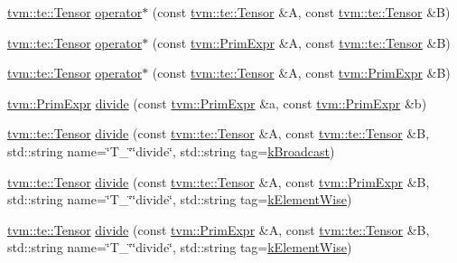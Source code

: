\begin{DoxyCompactItemize}
\item 
\hyperlink{classtvm_1_1te_1_1Tensor}{tvm\+::te\+::\+Tensor} \hyperlink{namespacetopi_a65ef01a87472380d8fb282bc16061583}{operator$\ast$} (const \hyperlink{classtvm_1_1te_1_1Tensor}{tvm\+::te\+::\+Tensor} \&A, const \hyperlink{classtvm_1_1te_1_1Tensor}{tvm\+::te\+::\+Tensor} \&B)
\item 
\hyperlink{classtvm_1_1te_1_1Tensor}{tvm\+::te\+::\+Tensor} \hyperlink{namespacetopi_a14b5d16d00a8b668c19e440a86a0244f}{operator$\ast$} (const \hyperlink{classtvm_1_1PrimExpr}{tvm\+::\+Prim\+Expr} \&A, const \hyperlink{classtvm_1_1te_1_1Tensor}{tvm\+::te\+::\+Tensor} \&B)
\item 
\hyperlink{classtvm_1_1te_1_1Tensor}{tvm\+::te\+::\+Tensor} \hyperlink{namespacetopi_a33baa22e21f625b772b34cf99b234d6d}{operator$\ast$} (const \hyperlink{classtvm_1_1te_1_1Tensor}{tvm\+::te\+::\+Tensor} \&A, const \hyperlink{classtvm_1_1PrimExpr}{tvm\+::\+Prim\+Expr} \&B)
\item 
\hyperlink{classtvm_1_1PrimExpr}{tvm\+::\+Prim\+Expr} \hyperlink{namespacetopi_ab98c1bef2250b920060a8d92f2db2d93}{divide} (const \hyperlink{classtvm_1_1PrimExpr}{tvm\+::\+Prim\+Expr} \&a, const \hyperlink{classtvm_1_1PrimExpr}{tvm\+::\+Prim\+Expr} \&b)
\item 
\hyperlink{classtvm_1_1te_1_1Tensor}{tvm\+::te\+::\+Tensor} \hyperlink{namespacetopi_a05b9306831fc8eba0b3796252129430e}{divide} (const \hyperlink{classtvm_1_1te_1_1Tensor}{tvm\+::te\+::\+Tensor} \&A, const \hyperlink{classtvm_1_1te_1_1Tensor}{tvm\+::te\+::\+Tensor} \&B, std\+::string name=\char`\"{}T\+\_\+\char`\"{}\char`\"{}divide\char`\"{}, std\+::string tag=\hyperlink{namespacetopi_a794b9155e9ba9d1c9c42a1cff1fb645f}{k\+Broadcast})
\item 
\hyperlink{classtvm_1_1te_1_1Tensor}{tvm\+::te\+::\+Tensor} \hyperlink{namespacetopi_a5907acb7699792da001c148fc85390f8}{divide} (const \hyperlink{classtvm_1_1te_1_1Tensor}{tvm\+::te\+::\+Tensor} \&A, const \hyperlink{classtvm_1_1PrimExpr}{tvm\+::\+Prim\+Expr} \&B, std\+::string name=\char`\"{}T\+\_\+\char`\"{}\char`\"{}divide\char`\"{}, std\+::string tag=\hyperlink{namespacetopi_ac1b34ed59d38a5f5338bee6b2cad42be}{k\+Element\+Wise})
\item 
\hyperlink{classtvm_1_1te_1_1Tensor}{tvm\+::te\+::\+Tensor} \hyperlink{namespacetopi_a6f29afd22f13ef5cec1c247c93381199}{divide} (const \hyperlink{classtvm_1_1PrimExpr}{tvm\+::\+Prim\+Expr} \&A, const \hyperlink{classtvm_1_1te_1_1Tensor}{tvm\+::te\+::\+Tensor} \&B, std\+::string name=\char`\"{}T\+\_\+\char`\"{}\char`\"{}divide\char`\"{}, std\+::string tag=\hyperlink{namespacetopi_ac1b34ed59d38a5f5338bee6b2cad42be}{k\+Element\+Wise})

\end{DoxyCompactItemize}
